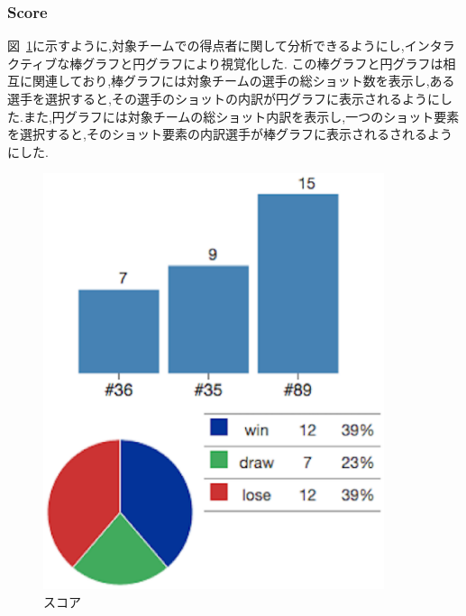 \documentclass[sotsuron]{kuee}
\begin{document}
			\subsubsection{Score}
				図~\ref{fig:score}に示すように,対象チームでの得点者に関して分析できるようにし,インタラクティブな棒グラフと円グラフにより視覚化した.
				この棒グラフと円グラフは相互に関連しており,棒グラフには対象チームの選手の総ショット数を表示し,ある選手を選択すると,その選手のショットの内訳が円グラフに表示されるようにした.また,円グラフには対象チームの総ショット内訳を表示し,一つのショット要素を選択すると,そのショット要素の内訳選手が棒グラフに表示されるされるようにした.
					\begin{figure}
						\begin{center}
							\includegraphics[width=10cm]{score.eps}
						\end{center}
						\caption{スコア}
				  		\label{fig:score}
					\end{figure}
\end{document}
